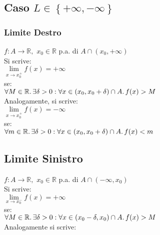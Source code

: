 \documentclass[a4paper, twoside, italian, 11pt]{book}
\newcommand{\braces}[1] {\left \{ #1 \right \}}
\newcommand{\R}{\mathbb{R}}
\begin{document}
\subsection{Caso $L \in \braces{+\infty, -\infty}$}


\subsubsection{Limite Destro}

\noindent
$f : A \rightarrow \R,$ $x_0 \in \R$ p.a. di $A \cap (x_0, +\infty)$ \\

\noindent
Si scrive: \\

$\lim\limits_{x \to x_0^+} f(x) = +\infty$ \\

\noindent
se: \\

$\forall M \in \R \ldotp \exists \delta > 0 : \forall x \in (x_0, x_0 + \delta) \cap A \ldotp f(x) > M$ \\

\noindent
Analogamente, si scrive: \\

$\lim\limits_{x \to x_0^+} f(x) = -\infty$ \\

\noindent
se: \\

$\forall m \in \R \ldotp \exists \delta > 0 : \forall x \in (x_0, x_0 + \delta) \cap A \ldotp f(x) < m$


\subsection{Limite Sinistro}

\noindent
$f : A \rightarrow \R,$ $x_0 \in \R$ p.a. di $A \cap (-\infty, x_0)$ \\

\noindent
Si scrive: \\

$\lim\limits_{x \to x_0^-} f(x) = +\infty$ \\

\noindent
se: \\

$\forall M \in \R \ldotp \exists \delta > 0 : \forall x \in (x_0 - \delta, x_0) \cap A \ldotp f(x) > M$ \\

\noindent
Analogamente si scrive: \\
\end{document}
